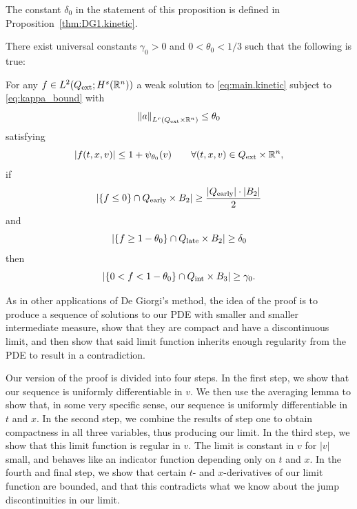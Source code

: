 The constant $\delta_0$ in the statement of this proposition is defined in Proposition~\ref{thm:DG1.kinetic}.  

\begin{proposition}\label{thm:DG2.kinetic}
There exist universal constants $\gamma_0 > 0$ and $0 < \theta_0 < 1/3$ such that the following is true:

For any $f \in L^2({Q_\textrm{ext}}; H^s(\mathbb{R}^n))$ a weak solution to \eqref{eq:main.kinetic} subject to \eqref{eq:kappa_bound} with
\[ \left\lVert a\right\rVert_{L^{r}({Q_\textrm{ext}} \times \mathbb{R}^n)} \leq \theta_0 \]
satisfying
\[ |f(t,x,v)| \leq 1 + \psi_{\theta_0}(v) \qquad \forall (t,x,v) \in {Q_\textrm{ext}} \times \mathbb{R}^n, \]
if
\begin{equation}\label{DG2_mass_early} 
|\{f \leq 0\} \cap {Q_\textrm{early}} \times B_2| \geq \frac{|{Q_\textrm{early}}| \cdot |B_2|}{2} 
\end{equation}
and
\begin{equation}\label{DG2_mass_late}
|\{f \geq 1-\theta_0 \} \cap {Q_\textrm{late}} \times B_2| \geq \delta_0 
\end{equation}
then
\begin{equation}\label{DG2_mass_between}
|\{0 < f < 1-\theta_0 \} \cap {Q_\textrm{int}} \times B_3| \geq \gamma_0. 
\end{equation}
\end{proposition}

As in other applications of De Giorgi's method, the idea of the proof is to produce a sequence of solutions to our PDE with smaller and smaller intermediate measure, show that they are compact and have a discontinuous limit, and then show that said limit function inherits enough regularity from the PDE to result in a contradiction.  

Our version of the proof is divided into four steps.  In the first step, we show that our sequence is uniformly differentiable in $v$.  We then use the averaging lemma to show that, in some very specific sense, our sequence is uniformly differentiable in $t$ and $x$.  In the second step, we combine the results of step one to obtain compactness in all three variables, thus producing our limit.  In the third step, we show that this limit function is regular in $v$.  The limit is constant in $v$ for $|v|$ small, and behaves like an indicator function depending only on $t$ and $x$.  In the fourth and final step, we show that certain $t$- and $x$-derivatives of our limit function are bounded, and that this contradicts what we know about the jump discontinuities in our limit.  


